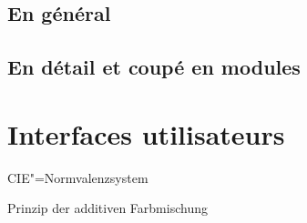 \documentclass[a4paper,12pt,abstracton,titlepage]{scrartcl}
\begin{document}
\subsection{En général}
\blindtext

\subsection{En détail et coupé en modules}
\blindtext


\section{Interfaces utilisateurs}
\blindtext





\begin{floatingfigure}[r]{6cm}
	\caption{CIE"=Normvalenzsystem}
	\label{cie}
\end{floatingfigure}



\begin{floatingfigure}[l]{5.3cm}
	\caption{Prinzip der additiven Farbmischung}
	\label{venn}
\end{floatingfigure}

\par



\vspace{2em}
\end{document}
